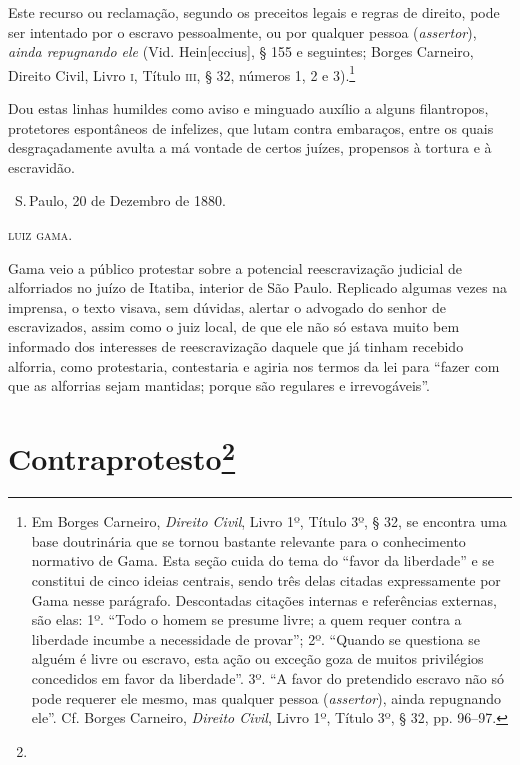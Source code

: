 Este recurso ou reclamação, segundo os preceitos legais e regras de
direito, pode ser intentado por o escravo pessoalmente, ou por qualquer
pessoa (\emph{assertor}), \emph{ainda repugnando ele} (Vid.
Hein{[}eccius{]}, § 155 e seguintes; Borges Carneiro, Direito Civil,
Livro \textsc{i}, Título \textsc{iii}, § 32, números 1, 2 e 3).\footnote{Em Borges
  Carneiro, \emph{Direito Civil}, Livro 1º, Título 3º, § 32, se encontra
  uma base doutrinária que se tornou bastante relevante para o
  conhecimento normativo de Gama. Esta seção cuida do tema do ``favor da
  liberdade'' e se constitui de cinco ideias centrais, sendo três delas
  citadas expressamente por Gama nesse parágrafo. Descontadas citações
  internas e referências externas, são elas: 1º. ``Todo o homem se
  presume livre; a quem requer contra a liberdade incumbe a necessidade
  de provar''; 2º. ``Quando se questiona se alguém é livre ou
  escravo, esta ação ou exceção goza de muitos privilégios concedidos em
  favor da liberdade''. 3º. ``A favor do pretendido escravo não só pode
  requerer ele mesmo, mas qualquer pessoa (\emph{assertor}), ainda
  repugnando ele''. Cf. Borges Carneiro, \emph{Direito Civil}, Livro 1º,
  Título 3º, § 32, pp. 96--97.}

Dou estas linhas humildes
como aviso e minguado auxílio a alguns filantropos, protetores
espontâneos de infelizes, que lutam contra embaraços, entre os quais
desgraçadamente avulta a má vontade de certos juízes, propensos à
tortura e à escravidão.

\bigskip

\hfill\ S.\,Paulo, 20 de Dezembro de 1880.\smallskip

\hfill\textsc{luiz gama}.

\pagebreak
\mbox{}\vfill
\thispagestyle{empty}

{\small\noindent
Gama veio a público protestar sobre a potencial reescravização
judicial de alforriados no juízo de Itatiba, interior de São Paulo.
Replicado algumas vezes na imprensa, o texto visava, sem dúvidas,
alertar o advogado do senhor de escravizados, assim como o juiz local,
de que ele não só estava muito bem informado dos interesses de
reescravização daquele que já tinham recebido alforria, como
protestaria, contestaria e agiria nos termos da lei para ``fazer com que
as alforrias sejam mantidas; porque são regulares e irrevogáveis''. }

\chapter{Contraprotesto\footnote[*]{}}



